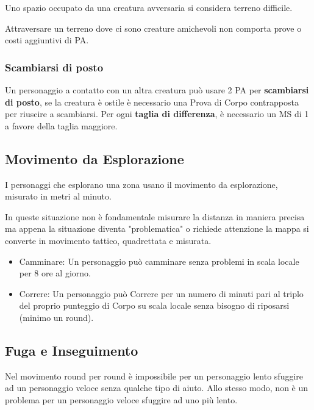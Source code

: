 \documentclass[12pt,a4paper,twoside,openany]{book}
\begin{document}
\begin{multicols}{2}
Uno spazio occupato da una creatura avversaria si considera terreno difficile.

Attraversare un terreno dove ci sono creature amichevoli non comporta prove o costi aggiuntivi di PA.

\subsubsection{Scambiarsi di posto}\label{scambiarsidiposto}

Un personaggio a contatto con un altra creatura può usare 2 PA per \textbf{scambiarsi di posto}, se la creatura è ostile è necessario una Prova di Corpo contrapposta per riuscire a scambiarsi. Per ogni \textbf{taglia di differenza}, è necessario un MS di 1 a favore della taglia maggiore.

\subsection{Movimento da Esplorazione}\label{movimentolocale}

I personaggi che esplorano una zona usano il movimento da esplorazione, misurato in metri al minuto.

In queste situazione non è fondamentale misurare la distanza in maniera precisa ma appena la situazione diventa "problematica" o richiede attenzione la mappa si converte in movimento tattico, quadrettata e misurata.

\medskip

\begin{itemize}
\item
Camminare: Un personaggio può camminare senza problemi in scala locale per 8 ore al giorno.
\item
Correre: Un personaggio può Correre per un numero di minuti pari al triplo del proprio punteggio di Corpo su scala locale senza bisogno di riposarsi (minimo un round).
\end{itemize}

\subsection{Fuga e Inseguimento}\label{fugainseguimento}

Nel movimento round per round è impossibile per un personaggio lento sfuggire ad un personaggio veloce senza qualche tipo di aiuto. Allo stesso modo, non è un problema per un personaggio veloce sfuggire ad uno più lento.


\end{multicols}
\end{document}
